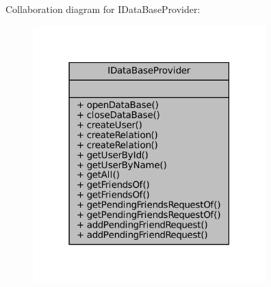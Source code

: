 Collaboration diagram for I\+Data\+Base\+Provider\+:
\nopagebreak
\begin{figure}[H]
\begin{center}
\leavevmode
\includegraphics[width=255pt]{classIDataBaseProvider__coll__graph}
\end{center}
\end{figure}
